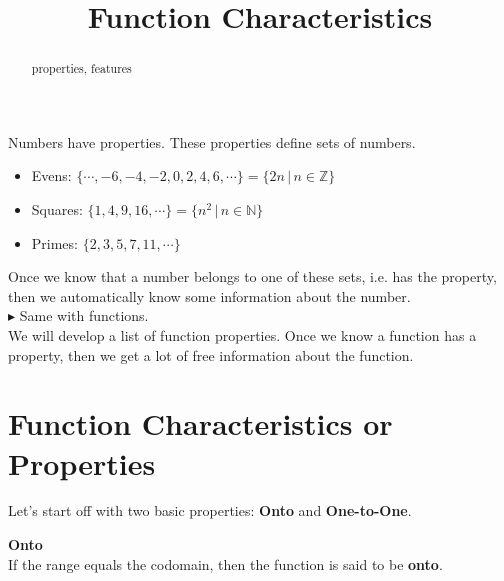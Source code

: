\documentclass{ximera}
\title{Function Characteristics}
\begin{document}
\begin{abstract}
properties, features
\end{abstract}
\maketitle





Numbers have properties.  These properties define sets of numbers.

\begin{itemize}
\item Evens:  $\{ \cdots, -6, -4, -2, 0, 2, 4, 6, \cdots \} = \{ 2n   \, | \, n \in \mathbb{Z} \}$
\item Squares:  $\{ 1, 4, 9, 16, \cdots \} = \{ n^2   \, | \, n \in \mathbb{N} \}$
\item Primes:  $\{ 2, 3, 5, 7, 11,  \cdots \}$
\end{itemize}

Once we know that a number belongs to one of these sets, i.e. has the property, then we automatically know some information about the number. \\


$\blacktriangleright$ Same with functions. \\



We will develop a list of function properties.  Once we know a function has a property, then we get a lot of free information about the function. \\









\section{Function Characteristics or Properties}


Let's start off with two basic properties: \textbf{Onto} and \textbf{One-to-One}.







\begin{definition} \textbf{\textcolor{green!50!black}{Onto}} \\

If the range equals the codomain, then the function is said to be \textbf{onto}.

\end{definition}
\end{document}
